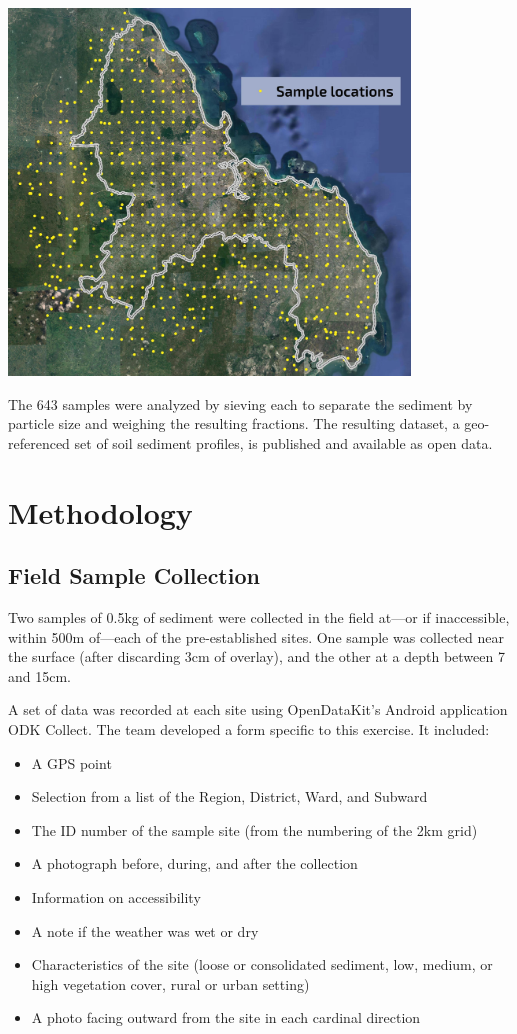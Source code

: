 \documentclass[a4paper,12pt]{article}
\begin{document}
\includegraphics[width=0.8\textwidth]{sample_locations.jpg}

The 643 samples were analyzed by sieving each to separate the sediment by particle size and weighing the resulting fractions. The resulting dataset, a geo-referenced set of soil sediment profiles, is published and available as open data.


\newpage
\section{Methodology}
\label{methodology}

\subsection{Field Sample Collection}
\label{fieldsamplecollection}
Two samples of 0.5kg of sediment were collected in the field at---or if inaccessible, within 500m of---each of the pre-established sites. One sample was collected near the surface (after discarding 3cm of overlay), and the other at a depth between 7 and 15cm.

A set of data was recorded at each site using OpenDataKit's Android application ODK Collect. The team developed a form specific to this exercise. It included:
\begin{itemize}
  \item A GPS point
  \item Selection from a list of the Region, District, Ward, and Subward
  \item The ID number of the sample site (from the numbering of the 2km grid)
  \item A photograph before, during, and after the collection
  \item Information on accessibility
  \item A note if the weather was wet or dry
  \item Characteristics of the site (loose or consolidated sediment, low, medium, or high vegetation cover, rural or urban setting)
  \item A photo facing outward from the site in each cardinal direction
\end{itemize}
\end{document}
